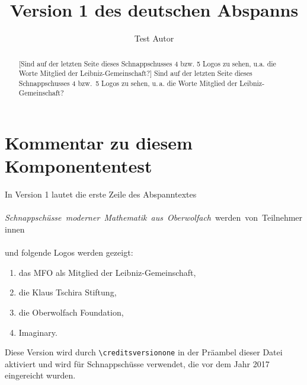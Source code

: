 \documentclass{snapshotmfo}
\author{Test Autor}
\title{Version 1 des deutschen Abspanns}
\begin{document}

\begin{abstract}[Sind auf der letzten Seite dieses Schnappschusses 4 bzw. 5 Logos zu sehen, u.a. die Worte \glqq Mitglied der Leibniz-Gemeinschaft\grqq ?]
Sind auf der letzten Seite dieses Schnappschusses 4 bzw.\ 5 Logos zu sehen, u.\,a. die Worte \glqq Mitglied der Leibniz-Gemeinschaft\grqq ?
\end{abstract}

\section{Kommentar zu diesem Komponententest}
In Version 1 lautet die erste Zeile des Abspanntextes\\
\\
\hbox{\emph{Schnappsch\"usse moderner Mathematik aus Oberwolfach} werden von Teilnehmerinnen}\\
\\
und folgende Logos werden gezeigt:
\begin{enumerate}
  \item das MFO als Mitglied der Leibniz-Gemeinschaft,
  \item die Klaus Tschira Stiftung,
  \item die Oberwolfach Foundation,
  \item Imaginary.
\end{enumerate}
Diese Version wird durch \verb+\creditsversionone+ in der Präambel dieser Datei aktiviert
und wird für Schnappschüsse verwendet, die vor dem Jahr 2017 eingereicht wurden.
\end{document}
